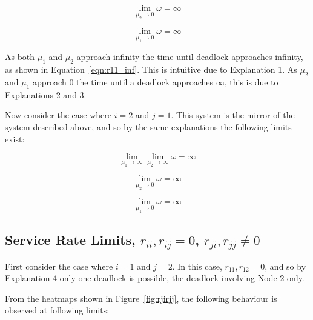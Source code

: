 \documentclass{article}
\begin{document}
\begin{equation}\label{eqn:r11__0}
\lim_{\mu_2 \to 0} \omega = \infty
\end{equation}

\begin{equation}\label{eqn:r11_0_}
\lim_{\mu_1 \to 0} \omega = \infty
\end{equation}

As both $\mu_1$ and $\mu_2$ approach infinity the time until deadlock approaches infinity, as shown in Equation~\ref{eqn:r11_inf}. This is intuitive due to Explanation 1.
As $\mu_2$ and $\mu_1$ approach $0$ the time until a deadlock approaches $\infty$, this is due to Explanations 2 and 3.


Now consider the case where $i = 2$ and $j = 1$.
This system is the mirror of the system described above, and so by the same explanations the following limits exist:

\begin{equation}\label{eqn:r22_inf}
\lim_{\mu_1 \to \infty} \lim_{\mu_2 \to \infty} \omega = \infty
\end{equation}

\begin{equation}\label{eqn:r22__0}
\lim_{\mu_2 \to 0} \omega = \infty
\end{equation}

\begin{equation}\label{eqn:r22_0_}
\lim_{\mu_1 \to 0} \omega = \infty
\end{equation}


\subsection{Service Rate Limits, $r_{ii}, r_{ij} = 0$, $r_{ji}, r_{jj} \neq 0$}\label{rjirjj}

First consider the case where $i = 1$ and $j = 2$.
In this case, $r_{11}, r_{12} = 0$, and so by Explanation 4 only one deadlock is possible, the deadlock involving Node 2 only.

From the heatmaps shown in Figure~\ref{fig:rjirjj}, the following behaviour is observed at following limits:
\end{document}
